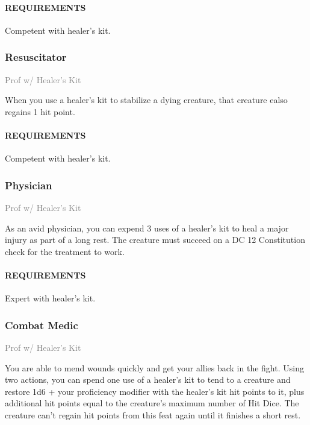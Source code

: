     \paragraph{REQUIREMENTS} Competent with healer's kit.

    \subsubsection{Resuscitator} \label{feat::resuscitator}
    \small{\textcolor{gray}{Prof w/ Healer's Kit}}

    \normalsize
    When you use a healer's kit to stabilize a dying creature, that creature ealso regains 1 hit point.
    \paragraph{REQUIREMENTS} Competent with healer's kit.

    \subsubsection{Physician} \label{feat::physician}
    \small{\textcolor{gray}{Prof w/ Healer's Kit}}

    \normalsize
    As an avid physician, you can expend 3 uses of a healer's kit to heal a major injury as part of a long rest.
    The creature must succeed on a DC 12 Constitution check for the treatment to work.
    \paragraph{REQUIREMENTS} Expert with healer's kit.

    \subsubsection{Combat Medic} \label{feat::combatmedic}
    \small{\textcolor{gray}{Prof w/ Healer's Kit}}

    \normalsize
    You are able to mend wounds quickly and get your allies back in the fight.
    Using two actions, you can spend one use of a healer's kit to tend to a creature and restore 1d6 + your proficiency modifier with the healer's kit hit points to it, plus additional hit points equal to the creature's maximum number of Hit Dice.
    The creature can't regain hit points from this feat again until it finishes a short rest.
